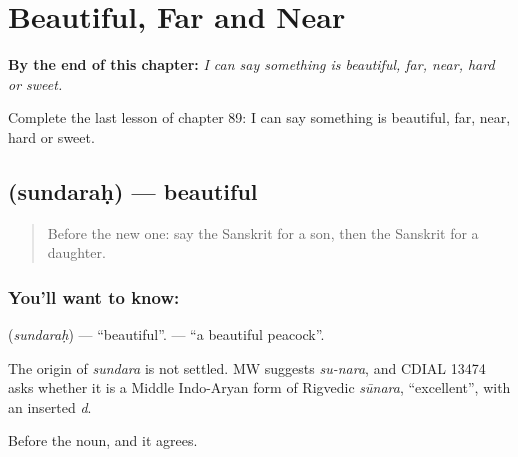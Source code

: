 
\chapter{Beautiful, Far and Near}
\label{ch:sa-beautiful-far-near}

\begin{chapteropening}
\textbf{By the end of this chapter:} \emph{I can say something is beautiful, far, near, hard or sweet.}

Complete the last lesson of chapter 89: I can say something is beautiful, far, near, hard or sweet.
\end{chapteropening}

\section[\texorpdfstring{\sk{सुन्दरः} (sundaraḥ)}{सुन्दरः (sundaraḥ)}]{ (sundaraḥ) — beautiful}

\label{lesson:SA-C89-beautiful}



\begin{quote}
Before the new one: say the Sanskrit for a son, then the Sanskrit for a daughter.
\end{quote}

\subsection*{You'll want to know: }
\textbf{} (\emph{sundaraḥ}) — \textquotedblleft{}beautiful\textquotedblright{}. \textbf{ } — \textquotedblleft{}a beautiful peacock\textquotedblright{}.

\begin{cousinweb}
The origin of \emph{sundara} is not settled. MW suggests \emph{su-nara}, and CDIAL 13474 asks whether it is a Middle Indo-Aryan form of Rigvedic \emph{sūnara}, \textquotedblleft{}excellent\textquotedblright{}, with an inserted \emph{d}.
\end{cousinweb}

\begin{grammarlens}[title={What you've built}]
Before the noun, and it agrees.
\end{grammarlens}

